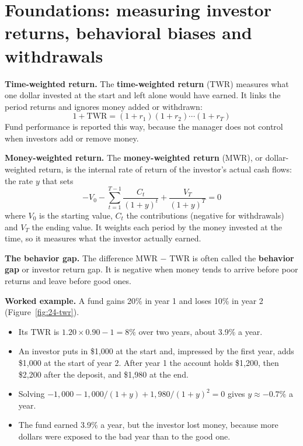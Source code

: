 \section{Foundations: measuring investor returns, behavioral biases and withdrawals}
\label{sec:24-foundations}

\textbf{Time-weighted return.} The \textbf{time-weighted return} (TWR) measures what one dollar invested at the start and left alone would have earned. It links the period returns and ignores money added or withdrawn:
\begin{equation}
  1 + \mathrm{TWR} = (1 + r_1)(1 + r_2)\cdots(1 + r_T)
  \label{eq:24-twr}
\end{equation}
Fund performance is reported this way, because the manager does not control when investors add or remove money.

\textbf{Money-weighted return.} The \textbf{money-weighted return} (MWR), or dollar-weighted return, is the internal rate of return of the investor's actual cash flows: the rate $y$ that sets
\begin{equation}
  -V_0 - \sum_{t=1}^{T-1}\frac{C_t}{(1 + y)^t} + \frac{V_T}{(1 + y)^T} = 0
  \label{eq:24-mwr}
\end{equation}
where $V_0$ is the starting value, $C_t$ the contributions (negative for withdrawals) and $V_T$ the ending value. It weights each period by the money invested at the time, so it measures what the investor actually earned.

\textbf{The behavior gap.} The difference MWR $-$ TWR is often called the \textbf{behavior gap} or investor return gap. It is negative when money tends to arrive before poor returns and leave before good ones.

\textbf{Worked example.} A fund gains 20\% in year 1 and loses 10\% in year 2 (Figure~\ref{fig:24-twr}).

\begin{itemize}
  \item Its TWR is $1.20 \times 0.90 - 1 = 8\%$ over two years, about 3.9\% a year.
  \item An investor puts in \$1,000 at the start and, impressed by the first year, adds \$1,000 at the start of year 2. After year 1 the account holds \$1,200, then \$2,200 after the deposit, and \$1,980 at the end.
  \item Solving $-1{,}000 - 1{,}000/(1 + y) + 1{,}980/(1 + y)^2 = 0$ gives $y \approx -0.7\%$ a year.
  \item The fund earned 3.9\% a year, but the investor lost money, because more dollars were exposed to the bad year than to the good one.
\end{itemize}

